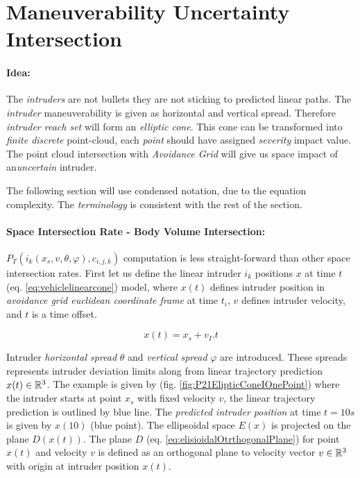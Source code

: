 \newpage
\section{Maneuverability Uncertainty Intersection}\label{s:uncertaintyIntersection}
\paragraph{Idea:} The \emph{intruders} are not bullets they are not sticking to predicted linear paths. The \emph{intruder} maneuverability is given as horizontal and vertical spread. Therefore \emph{intruder reach set} will form an \emph{elliptic cone}. This cone can be transformed into \emph{finite discrete } point-cloud, each \emph{point} should have assigned \emph{severity} impact value.  The point cloud intersection with  \emph{Avoidance Grid} will give us space impact of an\emph{uncertain} intruder.


\begin{note}
    The following section will use condensed notation, due to the equation complexity. The \emph{terminology} is consistent with the rest of the section. 
\end{note}

\paragraph{Space Intersection Rate - Body Volume Intersection:} $P_T(i_k({x}_s,{v},\theta,\varphi),c_{i,j,k})$
computation is less straight-forward than other space intersection rates. First let us define the linear intruder $i_k$ positions ${x}$ at time $t$ (eq. \ref{eq:vehiclelinearcone}) model, where ${x}(t)$ defines intruder position in \emph{avoidance grid euclidean coordinate frame} at time $t_i$, ${v}$ defines intruder velocity, and $t$ is a time offset.

\begin{equation}\label{eq:vehiclelinearcone}
    x(t)=x_s + v_I.t
\end{equation}

\noindent Intruder \emph{horizontal spread} $\theta$ and \emph{vertical spread} $\varphi$ are introduced. These spreads represents intruder deviation limits along from linear trajectory prediction ${x}(t)\in\mathbb{R}^3$. The example is given by (fig. \ref{fig:P21ElipticConeIOnePoint}) where the intruder starts at point ${x}_s$ with fixed velocity $v$, the linear trajectory prediction is outlined by blue line. The \emph{predicted intruder position} at time $t=10s$ is given by ${x}(10)$ (blue point). The ellipsoidal space $E({x})$ is projected on the plane $D({x}(t))$. The plane $D$ (eq. \ref{eq:elisioidalOtrthogonalPlane}) for point ${x}(t)$ and velocity ${v}$ is defined as an orthogonal plane to velocity vector ${v}\in\mathbb{R}^3$ with origin at intruder position ${x}(t)$. 

